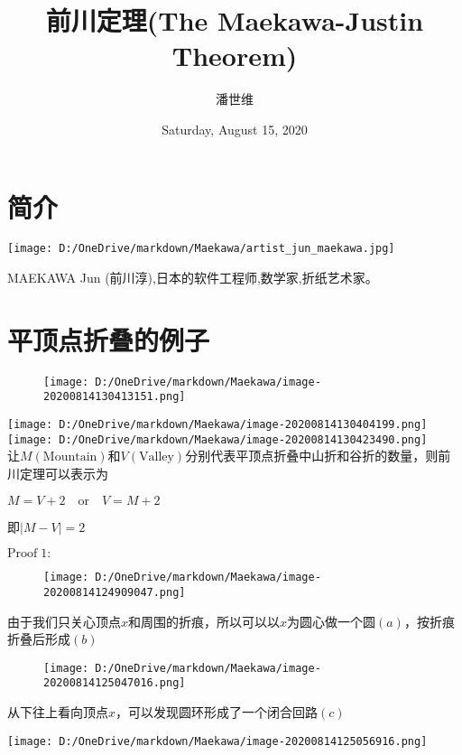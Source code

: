 \documentclass[a4paper,12pt]{article}
\begin{document}
\title {前川定理(The Maekawa-Justin Theorem)}
\author{潘世维}
\date{Saturday, August 15, 2020}
\maketitle
\section{简介} 
\texttt{[image: D:/OneDrive/markdown/Maekawa/artist\_jun\_maekawa.jpg]}

MAEKAWA Jun (前川淳),日本的软件工程师,数学家,折纸艺术家。

\section{平顶点折叠的例子}  

\begin{figure}[h]
    \centering
    \texttt{[image: D:/OneDrive/markdown/Maekawa/image-20200814130413151.png]}
\end{figure}

\texttt{[image: D:/OneDrive/markdown/Maekawa/image-20200814130404199.png]}\\
\texttt{[image: D:/OneDrive/markdown/Maekawa/image-20200814130423490.png]}\\


让$M(\text{Mountain})$和$V(\text{Valley})$分别代表平顶点折叠中山折和谷折的数量，则前川定理可以表示为

$M = V +2 \quad \text{or}\quad V = M + 2$

即$|M-V|=2$

$\text{Proof}\;1:$
\begin{figure}[h]
\centering
\texttt{[image: D:/OneDrive/markdown/Maekawa/image-20200814124909047.png]}
\end{figure}

由于我们只关心顶点$x$和周围的折痕，所以可以以$x$为圆心做一个圆$(a)$，按折痕折叠后形成$(b)$\\
\begin{figure}[h]
    \centering
    \texttt{[image: D:/OneDrive/markdown/Maekawa/image-20200814125047016.png]}\\
    \end{figure}


从下往上看向顶点$x$，可以发现圆环形成了一个闭合回路$(c)$


{\centering\texttt{[image: D:/OneDrive/markdown/Maekawa/image-20200814125056916.png]}}
\end{document}
